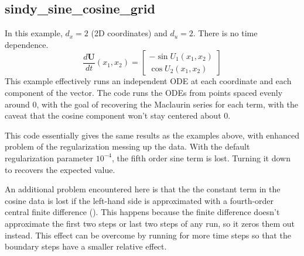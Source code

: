 \documentclass{article}
\let\vec\mathbf
\def\lstinline#1{}%
\begin{document}
\subsection{sindy\_sine\_cosine\_grid}
In this example, $d_x = 2$ (2D coordinates) and $d_u = 2$. There is no time dependence.
\begin{equation*}
\frac{d\vec{U}}{dt}(x_1, x_2) =
\begin{bmatrix}
-\sin U_1(x_1,x_2) \\ \cos U_2(x_1,x_2)
\end{bmatrix}
\end{equation*}
This example effectively runs an independent ODE at each coordinate and each
component of the vector. The code runs the ODEs from points spaced evenly around
0, with the goal of recovering the Maclaurin series for each term, with the
caveat that the cosine component won't stay centered about 0.

This code essentially gives the same results as the examples above, with
enhanced problem of the regularization messing up the data. With the default
regularization parameter $10^{-4}$, the fifth order sine term is lost. Turning
it down to \lstinline{-tao_brgn_regularizer_weight 1e-7} recovers the expected
value.

An additional problem encountered here is that the the constant term in the
cosine data is lost if the left-hand side is approximated with a fourth-order
central finite difference (\lstinline{-fd_der 1}). This happens because the
finite difference doesn't approximate the first two steps or last two steps of
any run, so it zeros them out instead. This effect can be overcome by running
for more time steps so that the boundary steps have a smaller relative effect.
\end{document}
